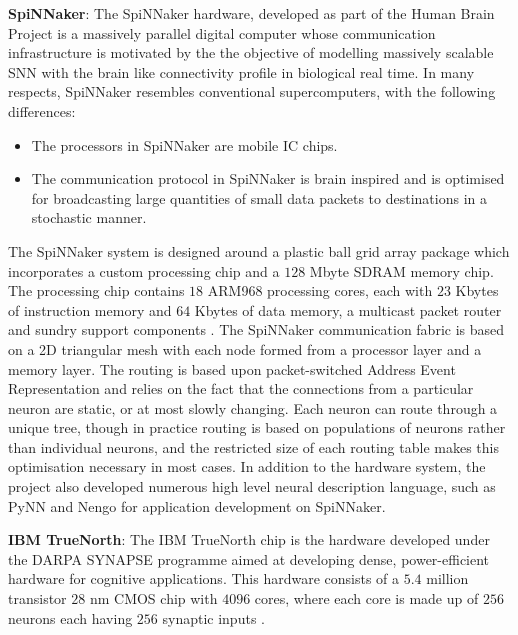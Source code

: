 \textbf{SpiNNaker}: The SpiNNaker hardware, developed as part of the Human Brain Project is a massively parallel digital computer whose communication infrastructure is motivated by the the objective of modelling massively scalable SNN with the  brain like connectivity profile in biological real time. In many respects, SpiNNaker resembles conventional supercomputers, with the following differences:
\begin{itemize}
	\item The processors in SpiNNaker are mobile IC chips.
	\item The communication protocol in SpiNNaker is brain inspired and is optimised for broadcasting large quantities of small data packets to destinations in a stochastic manner.
\end{itemize}
The SpiNNaker system is designed around a plastic ball grid array package which incorporates a custom processing chip and a $128$ Mbyte SDRAM memory chip. The processing chip contains $18$ ARM968 processing cores, each with $23$ Kbytes of instruction memory and $64$ Kbytes of data memory, a multicast packet router and sundry support components \citep{furber2016large}. The SpiNNaker communication fabric is based on a 2D triangular mesh with each node formed from a processor layer and a memory layer. The routing is based upon packet-switched Address Event Representation and relies on the fact that the connections from a particular neuron are static, or at most slowly
changing. Each neuron can route through a unique tree, though in practice routing is based on populations of neurons rather than individual neurons, and the restricted size of each routing table makes this optimisation necessary in most cases. In addition to the hardware system, the project also developed numerous high level neural description language, such as PyNN \citep{davison2008pynn} and Nengo \citep{bekolay2013nengo} for application development on SpiNNaker.

\textbf{IBM TrueNorth}: The IBM TrueNorth chip is the hardware developed under the DARPA SYNAPSE programme aimed at developing dense, power-efficient hardware for cognitive applications. This hardware consists of a $5.4$ million transistor $28$ nm CMOS chip with $4096$ cores, where each core is made up of $256$ neurons each having $256$ synaptic inputs \citep{cassidy2013cognitive}.

